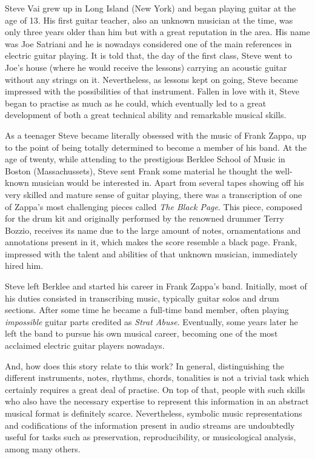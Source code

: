 Steve Vai grew up in Long Island (New York) and began playing guitar at the age of 13. His first guitar teacher, also an unknown musician at the time, was only three years older than him but with a great reputation in the area. His name was Joe Satriani and he is nowadays considered one of the main references in electric guitar playing. It is told that, the day of the first class, Steve went to Joe's house (where he would receive the lessons) carrying an acoustic guitar without any strings on it. Nevertheless, as lessons kept on going, Steve became impressed with the possibilities of that instrument. Fallen in love with it, Steve began to practise as much as he could, which eventually led to a great development of both a great technical ability and remarkable musical skills.

As a teenager Steve became literally obsessed with the music of Frank Zappa, up to the point of being totally determined to become a member of his band. At the age of twenty, while attending to the prestigious Berklee School of Music in Boston (Massachussets), Steve sent Frank some material he thought the well-known musician would be interested in. Apart from several tapes showing off his very skilled and mature sense of guitar playing, there was a transcription of one of Zappa's most challenging pieces called {\it The Black Page}. This piece, composed for the drum kit and originally performed by the renowned drummer Terry Bozzio, receives its name due to the large amount of notes, ornamentations and annotations present in it, which makes the score resemble a black page. Frank, impressed with the talent and abilities of that unknown musician, immediately hired him.

Steve left Berklee and started his career in Frank Zappa's band. Initially, most of his duties consisted in transcribing music, typically guitar solos and drum sections. After some time he became a full-time band member, often playing {\it impossible} guitar parts credited as {\it Strat Abuse}. Eventually, some years later he left the band to pursue his own musical career, becoming one of the most acclaimed electric guitar players nowadays.

And, how does this story relate to this work? In general, distinguishing the different instruments, notes, rhythms, chords, tonalities is not a trivial task which certainly requires a great deal of practise. On top of that, people with such skills who also have the necessary expertise to represent this information in an abstract musical format is definitely scarce. Nevertheless, symbolic music representations and codifications of the information present in audio streams are undoubtedly useful for tasks such as preservation, reproducibility, or musicological analysis, among many others.

